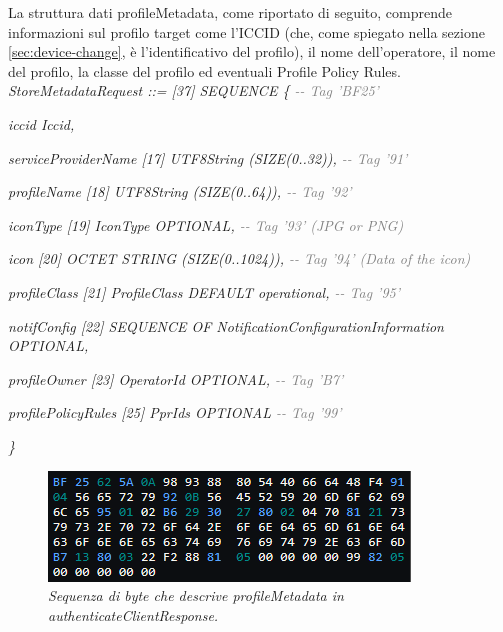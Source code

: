 \documentclass[10pt, oneside]{book}
\begin{document}
La struttura dati profileMetadata, come riportato di seguito, comprende informazioni sul profilo target come l'ICCID (che, come spiegato nella sezione \ref{sec:device-change}, è l'identificativo del profilo), il nome dell'operatore, il nome del profilo, la classe del profilo ed eventuali Profile Policy Rules.\\

\textit{StoreMetadataRequest ::= [37] SEQUENCE \{ \textcolor{gray}{{-}{-} Tag 'BF25'}}

\hspace{0.75cm} \textit{iccid Iccid,}

\hspace{0.75cm} \textit{serviceProviderName [17] UTF8String (SIZE(0..32)), \textcolor{gray}{{-}{-} Tag '91'}}

\hspace{0.75cm} \textit{profileName [18] UTF8String (SIZE(0..64)), \textcolor{gray}{{-}{-} Tag '92'}}

\hspace{0.75cm} \textit{iconType [19] IconType OPTIONAL, \textcolor{gray}{{-}{-} Tag '93' (JPG or PNG)}}

\hspace{0.75cm} \textit{icon [20] OCTET STRING (SIZE(0..1024)), \textcolor{gray}{{-}{-} Tag '94' (Data of the icon)}}

\hspace{0.75cm} \textit{profileClass [21] ProfileClass DEFAULT operational, \textcolor{gray}{{-}{-} Tag '95'}}

\hspace{0.75cm} \textit{notifConfig [22] SEQUENCE OF NotificationConfigurationInformation OPTIONAL,}

\hspace{0.75cm} \textit{profileOwner [23] OperatorId OPTIONAL, \textcolor{gray}{{-}{-} Tag 'B7'}}

\hspace{0.75cm} \textit{profilePolicyRules [25] PprIds OPTIONAL \textcolor{gray}{{-}{-} Tag '99'}}

\textit{\}\\}

\begin{figure}
\includegraphics[width=\linewidth]{asn1-profileMetadata.png}
\caption{\textit{Sequenza di byte che descrive profileMetadata in authenticateClientResponse.}}
\label{fig:asn1-profileMetadata}
\end{figure}
\end{document}
